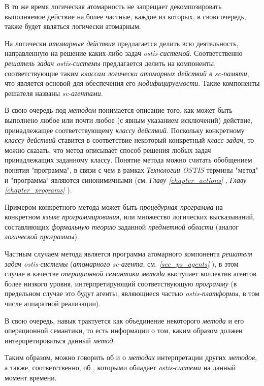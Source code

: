 В то же время логическая атомарность не запрещает декомпозировать выполняемое действие на более частные, каждое из которых, в свою очередь, также будет являться логически атомарным.
	
На логически \textit{атомарные действия} предлагается делить всю деятельность, направленную на решение каких-либо задач \textit{ostis-системой}. Соответственно \textit{решатель задач ostis-системы} предлагается делить на компоненты, соответствующие таким \textit{классам логически атомарных действий в sc-памяти}, что является основой для обеспечения его \textit{модифицируемости}. Такие компоненты решателя названы \textit{sc-агентами}.

В свою очередь под \textit{методом} понимается описание того, как может быть выполнено любое или почти любое (с явным указанием исключений) действие, принадлежащее соответствующему \textit{классу действий}. Поскольку конкретному \textit{классу действий} ставится в соответствие некоторый конкретный \textit{класс задач}, то можно сказать, что метод описывает способ решения любых задач принадлежащих заданному классу. Понятие метода можно считать обобщением понятия "программа"{}, в связи с чем в рамках \textit{Технологии OSTIS} термины "метод"{} и "программа"{} являются синонимичными (см. \textit{Главу \ref{chapter_actions} }, \textit{Главу \ref{chapter_programs} }).

Примером конкретного метода может быть \textit{процедурная программа} на конкретном \textit{языке программирования}, или множество логических высказываний, составляющих \textit{формальную теорию} заданной \textit{предметной области} (аналог \textit{логической программы}). 

Частным случаем метода является программа атомарного компонента \textit{решателя задач ostis-системы} (\textit{атомарного sc-агента}, см. \textit{\ref{sec_ps_agents} }), в этом случае в качестве \textit{операционной семантики метода} выступает коллектив агентов более низкого уровня, интерпретирующий соответствующую \textit{программу} (в предельном случае это будут агенты, являющиеся частью \textit{ostis-платформы}, в том числе аппаратной реализации).

В свою очередь, навык трактуется как объединение некоторого \textit{метода} и его операционной семантики, то есть информации о том, каким образом должен интерпретироваться данный \textit{метод}.

Таким образом, можно говорить об  и о \textit{методах} интерпретации других \textit{методов}, а также, соответственно, об , которыми обладает \textit{ostis-система} на данный момент времени.

